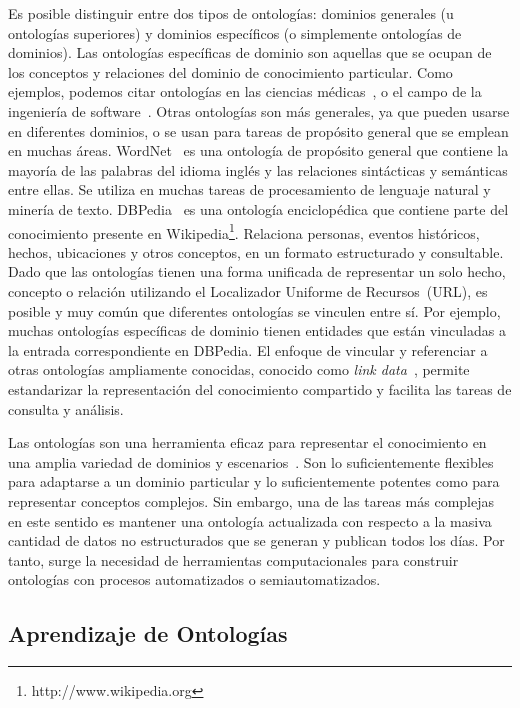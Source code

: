 Es posible distinguir entre dos tipos de ontologías: dominios generales (u ontologías superiores) y dominios específicos (o simplemente ontologías de dominios). Las ontologías específicas de dominio son aquellas que se ocupan de los conceptos y relaciones del dominio de conocimiento particular. 
Como ejemplos, podemos citar ontologías en las ciencias médicas~\cite{rector2003opengalen, gene2004gene}, o el campo de la ingeniería de software~\cite{4641930}. 
Otras ontologías son más generales, ya que pueden usarse en diferentes dominios, o se usan para tareas de propósito general que se emplean en muchas áreas. WordNet~\cite{miller1995wordnet} es una ontología de propósito general que contiene la mayoría de las palabras del idioma inglés y las relaciones sintácticas y semánticas entre ellas. 
Se utiliza en muchas tareas de procesamiento de lenguaje natural y minería de texto. 
DBPedia~\cite{mendes2012dbpedia} es una ontología enciclopédica que contiene parte del conocimiento presente en Wikipedia\footnote{http://www.wikipedia.org}. 
Relaciona personas, eventos históricos, hechos, ubicaciones y otros conceptos, en un formato estructurado y consultable. Dado que las ontologías tienen una forma unificada de representar un solo hecho, concepto o relación utilizando el Localizador Uniforme de Recursos~(URL), es posible y muy común que diferentes ontologías se vinculen entre sí. 
Por ejemplo, muchas ontologías específicas de dominio tienen entidades que están vinculadas a la entrada correspondiente en DBPedia. 
El enfoque de vincular y referenciar a otras ontologías ampliamente conocidas, conocido como \textit{link data}~\cite{bizer2009linked}, permite estandarizar la representación del conocimiento compartido y facilita las tareas de consulta y análisis.

Las ontologías son una herramienta eficaz para representar el conocimiento en una amplia variedad de dominios y escenarios~\cite{staab2010handbook}. 
Son lo suficientemente flexibles para adaptarse a un dominio particular y lo suficientemente potentes como para representar conceptos complejos. 
Sin embargo, una de las tareas más complejas en este sentido es mantener una ontología actualizada con respecto a la masiva cantidad de datos no estructurados que se generan y publican todos los días. 
Por tanto, surge la necesidad de herramientas computacionales para construir ontologías con procesos automatizados o semiautomatizados.

\subsection{Aprendizaje de Ontologías}

